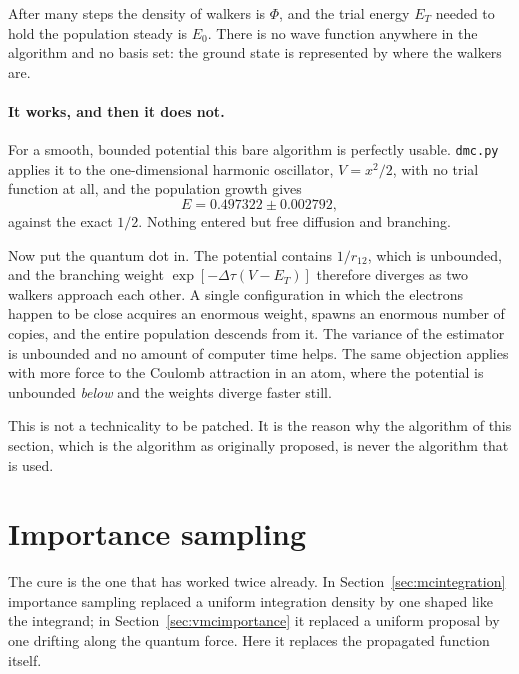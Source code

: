 \noindent
After many steps the density of walkers is $\Phi$, and the trial energy $E_T$
needed to hold the population steady is $E_0$.  There is no wave function
anywhere in the algorithm and no basis set: the ground state is represented by
where the walkers are.

\paragraph{It works, and then it does not.}
For a smooth, bounded potential this bare algorithm is perfectly usable.
\texttt{dmc.py} applies it to the one-dimensional harmonic oscillator,
$V=x^2/2$, with no trial function at all, and the population growth gives
\begin{equation*}
  E = 0.497322 \pm 0.002792 ,
\end{equation*}
against the exact $1/2$.  Nothing entered but free diffusion and branching.

Now put the quantum dot in.  The potential contains $1/r_{12}$, which is
unbounded, and the branching weight $\exp[-\Delta\tau(V-E_T)]$ therefore
diverges as two walkers approach each other.  A single configuration in which
the electrons happen to be close acquires an enormous weight, spawns an
enormous number of copies, and the entire population descends from it.  The
variance of the estimator is unbounded and no amount of computer time helps.
The same objection applies with more force to the Coulomb attraction in an
atom, where the potential is unbounded \emph{below} and the weights diverge
faster still.

This is not a technicality to be patched.  It is the reason why the algorithm
of this section, which is the algorithm as originally proposed, is never the
algorithm that is used.

\section{Importance sampling}
\label{sec:dmcimportance}

The cure is the one that has worked twice already.  In
Section~\ref{sec:mcintegration} importance sampling replaced a uniform
integration density by one shaped like the integrand; in
Section~\ref{sec:vmcimportance} it replaced a uniform proposal by one drifting
along the quantum force.  Here it replaces the propagated function itself.

